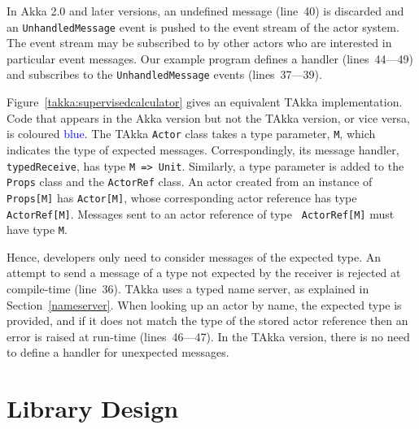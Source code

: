 In Akka 2.0 and later versions, an undefined message (line~40) is discarded and 
an {\tt UnhandledMessage} event is pushed to the event stream of the 
actor system. The event stream may be subscribed to by other actors who are 
interested in particular event messages. Our example program defines a
handler (lines~44---49) and subscribes to the {\tt UnhandledMessage} events
(lines~37---39).

Figure~\ref{takka:supervisedcalculator} gives an equivalent TAkka 
implementation. Code that appears in the Akka version but not the TAkka
version, or vice versa, is coloured \textcolor{blue}{blue}.  The 
TAkka {\tt Actor} class takes a type parameter, 
{\tt M}, which indicates the type of expected messages.  Correspondingly, its 
message handler, {\tt typedReceive}, has type
{\tt M => Unit}.
Similarly, a type parameter is added to the {\tt Props} 
class and the {\tt ActorRef} class.  An actor created from an instance of 
{\tt Props[M]} has {\tt Actor[M]}, whose corresponding actor reference 
has type {\tt ActorRef[M]}.  Messages sent to an actor reference of type {\tt 
ActorRef[M]} must have type {\tt M}.

Hence, developers only need to consider messages of the expected
type. An attempt to send a message of a type not expected by the
receiver is rejected at compile-time (line~36).  TAkka uses a typed
name server, as explained in Section~\ref{nameserver}.  When looking
up an actor by name, the expected type is provided, and if it does not
match the type of the stored actor reference then an error is raised
at run-time (lines~46---47).  In the TAkka version, there is no need to
define a handler for unexpected messages.

\section{Library Design}
\label{takka_design}

